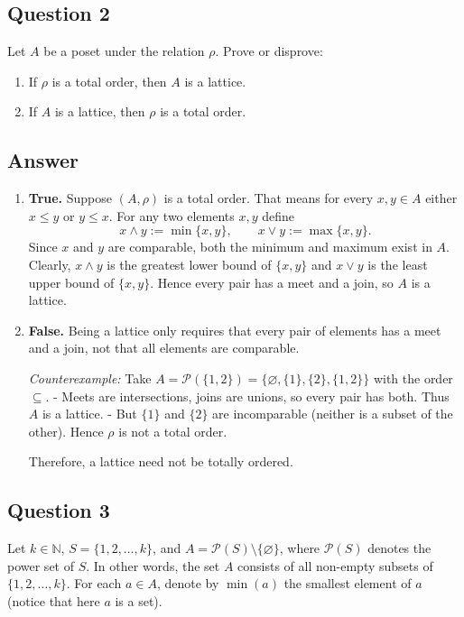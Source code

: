 \documentclass{article}
\begin{document}
\subsection*{Question 2}
Let $A$ be a poset under the relation $\rho$. Prove or disprove:
\begin{enumerate}
    \item If $\rho$ is a total order, then $A$ is a lattice.
    \item If $A$ is a lattice, then $\rho$ is a total order.
\end{enumerate}

\subsection*{Answer}
\begin{enumerate}
    \item \textbf{True.}  
    Suppose $(A,\rho)$ is a total order. That means for every $x,y\in A$ either $x\leq y$ or $y\leq x$.  
    For any two elements $x,y$ define
    \[
    x\wedge y := \min\{x,y\}, \qquad x\vee y := \max\{x,y\}.
    \]
    Since $x$ and $y$ are comparable, both the minimum and maximum exist in $A$. Clearly, $x\wedge y$ is the greatest lower bound of $\{x,y\}$ and $x\vee y$ is the least upper bound of $\{x,y\}$.  
    Hence every pair has a meet and a join, so $A$ is a lattice.

    \item \textbf{False.}  
    Being a lattice only requires that every pair of elements has a meet and a join, not that all elements are comparable.  

    \medskip
    \textit{Counterexample:}  
    Take $A=\mathcal{P}(\{1,2\})=\{\varnothing,\{1\},\{2\},\{1,2\}\}$ with the order $\subseteq$.  
    - Meets are intersections, joins are unions, so every pair has both. Thus $A$ is a lattice.  
    - But $\{1\}$ and $\{2\}$ are incomparable (neither is a subset of the other). Hence $\rho$ is not a total order.  

    Therefore, a lattice need not be totally ordered.
\end{enumerate}


\subsection*{Question 3}
Let $k \in \mathbb{N}$, $S = \{1,2,\dots, k\}$, and $A = \mathcal{P}(S) \setminus \{\varnothing\}$, where $\mathcal{P}(S)$ denotes the power set of $S$. In other words,
the set $A$ consists of all non-empty subsets of $\{1,2,\dots, k\}$. For each $a \in A$, denote by $\min(a)$ the smallest
element of $a$ (notice that here $a$ is a set).
\end{document}
